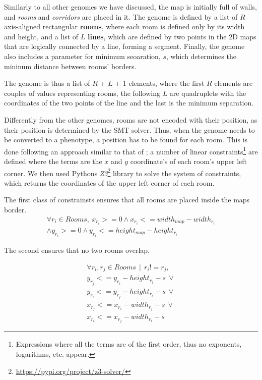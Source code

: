 \documentclass{Configuration_Files/PoliMi3i_thesis}
\begin{document}
Similarly to all other genomes we have discussed, the map is initially full of walls, and \textit{rooms} and \textit{corridors} are placed in it.
The genome is defined by a list of $R$ axis-aligned rectangular \textbf{rooms}, where each room is defined only by its width and height, and a list of $L$ \textbf{lines}, which are defined by two points in the 2D maps that are logically connected by a line, forming a segment. Finally, the genome also includes a parameter for minimum seoaration, $s$, which determines the mininum distance between rooms' borders. 

The genome is thus a list of $R$ + $L$ + 1 elements, where the first $R$ elements are couples of values representing rooms, the following $L$ are quadruplets with the coordinates of the two points of the line and the last is the minimum separation.

Differently from the other genomes, rooms are not encoded with their position, as their position is determined by the SMT solver. Thus, when the genome needs to be converted to a phenotype, a position has to be found for each room. This is done following an approach similar to that of \citet{whitehead_spatial_2020}; a number of linear constraints\footnote{Expressions where all the terms are of the first order, thus no exponents, logarithms, etc. appear.} are defined where the terms are the $x$ and $y$ coordinate's of each room's upper left corner. We then used Pythons \textit{Z3}\footnote{\url{https://pypi.org/project/z3-solver/}} library to solve the system of constraints, which returns the coordinates of the upper left corner of each room.

The first class of constrainsts ensures that all rooms are placed inside the maps border. 
\begin{equation}
    \begin{split}
            \forall r_i \in Rooms,\: x_{r_i} >= 0 \land x_{r_i} <= width_{map} - width_{r_i} \\ \land y_{r_i} >= 0 \land y_{r_i} <= height_{map} - height_{r_i}
    \end{split}
\end{equation}

The second ensures that no two rooms overlap.

\begin{equation}
\label{eq:room_overlap}
    \begin{split}
        \forall r_i, r_j \in Rooms\, \mid\,  r_i != r_j, \\
        y_{r_j} <= y_{r_i} - height_{r_j} - s\: \lor \\
        y_{r_i} <= y_{r_j} - height_{r_i} - s\: \lor \\
        x_{r_j} <= x_{r_i} - width_{r_j} - s\: \lor \\
        x_{r_i} <= x_{r_j} - width_{r_i} - s
    \end{split}
\end{equation}
\end{document}
